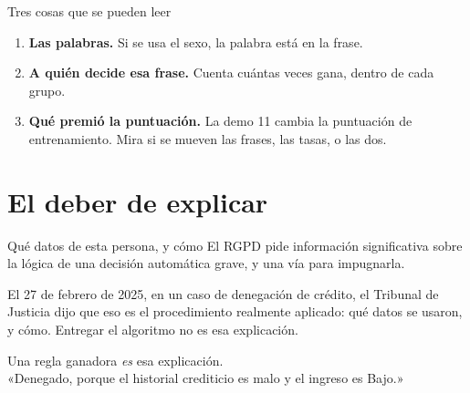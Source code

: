 \documentclass[aspectratio=169,11pt]{beamer}
\begin{document}
\begin{frame}{Tres cosas que se pueden leer}
  \begin{enumerate}
    \item \textbf{Las palabras.} Si se usa el sexo, la palabra está en la frase.
    \item \textbf{A quién decide esa frase.} Cuenta cuántas veces gana, dentro de cada grupo.
    \item \textbf{Qué premió la puntuación.} La demo 11 cambia la puntuación de entrenamiento. Mira si se mueven las frases, las tasas, o las dos.
  \end{enumerate}
\end{frame}

\section{El deber de explicar}

\begin{frame}{Qué datos de esta persona, y cómo}
  El RGPD pide información significativa sobre la lógica de una decisión automática grave, y una vía para impugnarla.
  \vspace{0.55em}

  El 27 de febrero de 2025, en un caso de denegación de crédito, el Tribunal de Justicia dijo que eso es el procedimiento realmente aplicado: qué datos se usaron, y cómo. Entregar el algoritmo no es esa explicación.

  \vspace{0.55em}
  \colorbox{ebdsage}{\parbox{0.96\textwidth}{%
    \vspace{0.35em}
    Una regla ganadora \emph{es} esa explicación.\\
    «Denegado, porque el historial crediticio es malo y el ingreso es Bajo.»
    \vspace{0.35em}}}
\end{frame}
\end{document}
